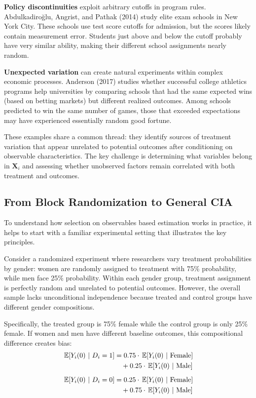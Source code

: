 \documentclass[12pt]{article}
\begin{document}
\begin{multicols}{2}
\textbf{Policy discontinuities} exploit arbitrary cutoffs in program rules.
Abdulkadiroğlu, Angrist, and Pathak (2014) study elite exam schools in New York City.
These schools use test score cutoffs for admission, but the scores likely contain measurement error.
Students just above and below the cutoff probably have very similar ability, making their different school assignments nearly random.

\textbf{Unexpected variation} can create natural experiments within complex economic processes.
Anderson (2017) studies whether successful college athletics programs help universities by comparing schools that had the same expected wins (based on betting markets) but different realized outcomes.
Among schools predicted to win the same number of games, those that exceeded expectations may have experienced essentially random good fortune.

These examples share a common thread: they identify sources of treatment variation that appear unrelated to potential outcomes after conditioning on observable characteristics.
The key challenge is determining what variables belong in $\bm{X}_i$ and assessing whether unobserved factors remain correlated with both treatment and outcomes.

\subsection*{From Block Randomization to General CIA}

To understand how selection on observables based estimation works in practice, it helps to start with a familiar experimental setting that illustrates the key principles.

Consider a randomized experiment where researchers vary treatment probabilities by gender: women are randomly assigned to treatment with 75\% probability, while men face 25\% probability.
Within each gender group, treatment assignment is perfectly random and unrelated to potential outcomes.
However, the overall sample lacks unconditional independence because treated and control groups have different gender compositions.

Specifically, the treated group is 75\% female while the control group is only 25\% female.
If women and men have different baseline outcomes, this compositional difference creates bias:
\begin{align*}
\expec{Y_i(0)}{D_i = 1} 
  &= 0.75 \cdot \expec{Y_i(0)}{\text{Female}} \\
  &\quad+ 0.25 \cdot \expec{Y_i(0)}{\text{Male}} \\[0.5em]
\expec{Y_i(0)}{D_i = 0} 
  &= 0.25 \cdot \expec{Y_i(0)}{\text{Female}} \\ 
  &\quad+ 0.75 \cdot \expec{Y_i(0)}{\text{Male}}
\end{align*}


\end{multicols}
\end{document}
